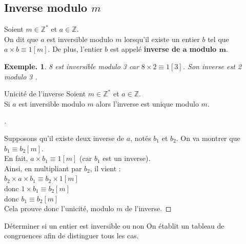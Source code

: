 \documentclass[12pt]{article}
\newcommand{\hideM}[1]{#1}
\newcommand{\hide}[1]{#1}
\theoremstyle{break}
\newtheorem*{example}{Exemple.}
\newenvironment{demo}[1][\proofname]{%
  \begin{proof}[#1]$ $\newline
}{%
  \end{proof}
}
\begin{document}
\subsection{Inverse modulo $m$}
\begin{definition}{}{}
    Soient $m \in \mathbb{Z}^{*}$ et $a \in \mathbb{Z}$.\\
    On dit que $a$ est inversible modulo $m$ lorsqu'il existe un entier $b$ tel que $\hideM{a \times b \equiv 1[m]}$. De plus, l'entier $b$ est appelé \textbf{inverse de $\boldsymbol{a}$ modulo $\boldsymbol{m}$}.
\end{definition}

\begin{example}
    8 est inversible modulo 3 car $8 \times 2 \equiv 1[3]$. Son inverse est 2 modulo 3 .
\end{example}

\begin{proposition}{Unicité de l'inverse}{}
    Soient $m \in \mathbb{Z}^{*}$ et $a \in \mathbb{Z}$.\\
    Si $a$ est inversible modulo $m$ alors \hide{l'inverse est unique modulo $m$}.
\end{proposition}

\begin{demo}
    Supposons qu'il existe deux inverse de $a$, notés $b_{1}$ et $b_{2}$. On va montrer que $b_{1} \equiv b_{2}[m]$.\\
    En fait, $a \times b_{1} \equiv 1[m]$ (car $b_{1}$ est un inverse).\\
    Ainsi, en multipliant par $b_{2}$, il vient :\\
    $b_{2} \times a \times b_{1} \equiv b_{2} \times 1[m]$\\
    donc $1 \times b_{1} \equiv b_{2}[m]$\\
    donc $b_{1} \equiv b_{2}[m]$\\
    Cela prouve donc l'unicité, modulo $m$ de l'inverse.
\end{demo}

\begin{method}{Déterminer si un entier est inversible ou non}{}
    On établit un tableau de congruences afin de distinguer tous les cas.
\end{method}
\end{document}
